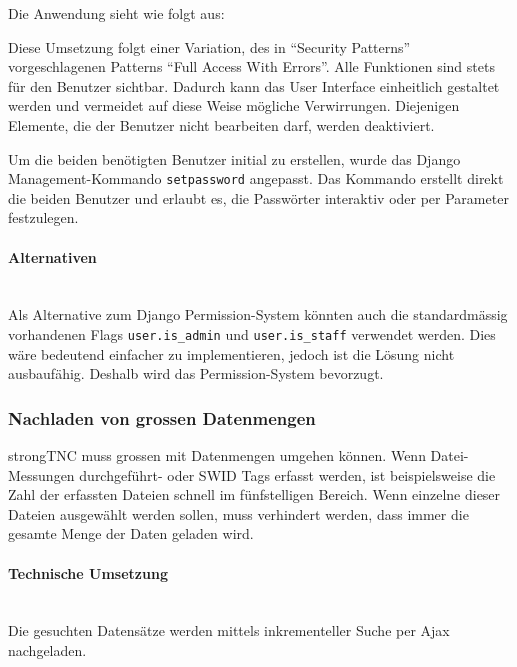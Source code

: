Die Anwendung sieht wie folgt aus:


Diese Umsetzung folgt einer Variation, des in \enquote{Security
Patterns}\cite{schumacher2013security} vorgeschlagenen Patterns \enquote{Full
Access With Errors}. Alle Funktionen sind stets für den Benutzer sichtbar.
Dadurch kann das User Interface einheitlich gestaltet werden und vermeidet auf
diese Weise mögliche Verwirrungen. Diejenigen Elemente, die der Benutzer nicht
bearbeiten darf, werden deaktiviert.

Um die beiden benötigten Benutzer initial zu erstellen, wurde das Django
Management-Kommando \texttt{setpassword} angepasst. Das Kommando erstellt direkt
die beiden Benutzer und erlaubt es, die Passwörter interaktiv oder per Parameter
festzulegen.

\paragraph{Alternativen} \hspace{0px} \\
Als Alternative zum Django Permission-System könnten auch die standardmässig
vorhandenen Flags \texttt{user.is\_admin} und \texttt{user.is\_staff} verwendet
werden. Dies wäre bedeutend einfacher zu implementieren, jedoch ist die Lösung
nicht ausbaufähig. Deshalb wird das Permission-System bevorzugt.

\subsubsection{Nachladen von grossen Datenmengen}
strongTNC muss grossen mit Datenmengen umgehen können. Wenn Datei-Messungen
durchgeführt- oder SWID Tags erfasst werden, ist beispielsweise die Zahl der
erfassten Dateien schnell im fünfstelligen Bereich. Wenn einzelne dieser Dateien
ausgewählt werden sollen, muss verhindert werden, dass immer die gesamte Menge
der Daten geladen wird.

\paragraph{Technische Umsetzung} \hspace{0pt} \\
Die gesuchten Datensätze werden mittels inkrementeller Suche per Ajax
nachgeladen.

